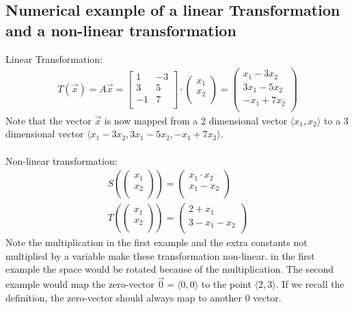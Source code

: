 \documentclass[11pt, a4paper]{article}
\begin{document}
\subsection{Numerical example of a linear Transformation and a non-linear transformation}
Linear Transformation:
\begin{align*}
  T(\vec{x}) = A\vec{x} = 
    \begin{bmatrix}
      1 & -3\\
      3 & 5\\
      -1 & 7\\
    \end{bmatrix}
    \cdot
    \begin{pmatrix} x_1 \\ x_2 \\ \end{pmatrix} 
    =
    \begin{pmatrix}
      x_1 - 3x_2\\
      3x_1 - 5x_2\\
      -x_1 + 7x_2\\
    \end{pmatrix}
\end{align*}
Note that the vector $\vec{x}$ is now mapped from a 2 dimensional vector $\langle x_1, x_2 \rangle$ to 
a 3 dimensional vector $\langle x_1 - 3x_2, 3x_1 - 5x_2, -x_1 + 7x_2 \rangle$.\\
\\
Non-linear transformation:
\begin{align*}
  S\left( \begin{pmatrix} x_1\\ x_2\\ \end{pmatrix} \right) =
    \begin{pmatrix} x_1\cdot x_2\\ x_1-x_2\\ \end{pmatrix}
\\
T\left( \begin{pmatrix} x_1\\ x_2\\ \end{pmatrix} \right) =
  \begin{pmatrix} 2 + x_1\\ 3-x_1-x_2\\ \end{pmatrix}
\end{align*}
Note the multiplication in the first example and the extra constants not multiplied by a variable make these
transformation non-linear. in the first example the space would be rotated because of the multiplication.
The second example would map the zero-vector $\vec{0} = \langle 0, 0 \rangle$ to the point $\langle 2, 3 \rangle$. If we recall
the definition, the zero-vector should always map to another 0 vector.
\end{document}
